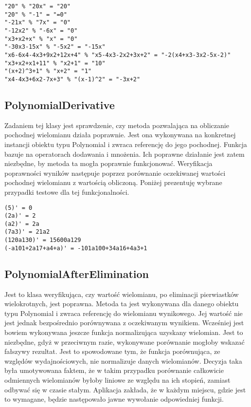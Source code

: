 \documentclass[twoside,a4paper]{book}
\begin{document}
\begin{lstlisting}
"20" % "20x" = "20"
"20" % "-1" = "=0"
"-21x" % "7x" = "0"
"-12x2" % "-6x" = "0"
"x3+x2+x" % "x" = "0"
"-30x3-15x" % "-5x2" = "-15x"
"x6-6x4-4x3+9x2+12x+4" % "x5-4x3-2x2+3x+2" = "-2(x4+x3-3x2-5x-2)"
"x3+x2+x1+11" % "x2+1" = "10"
"(x+2)^3+1" % "x+2" = "1"
"x4-4x3+6x2-7x+3" % "(x-1)^2" = "-3x+2"
\end{lstlisting}

\subsection{PolynomialDerivative}

Zadaniem tej klasy jest sprawdzenie, czy metoda pozwalająca na obliczanie pochodnej wielomianu działa poprawnie. Jest ona wykonywana na konkretnej instancji obiektu typu Polynomial i zwraca referencję do jego pochodnej. Funkcja bazuje na operatorach dodawania i mnożenia. Ich poprawne działanie jest zatem niezbędne, by metoda ta mogła poprawnie funkcjonować.
Weryfikacja poprawności wyników następuje poprzez porównanie oczekiwanej wartości pochodnej wielomianu z wartością obliczoną. Poniżej prezentuję wybrane przypadki testowe dla tej funkcjonalności.

\begin{lstlisting}
(5)' = 0
(2a)' = 2
(a2)' = 2a
(7a3)' = 21a2
(120a130)' = 15600a129
(-a101+2a17+a4+a)' = -101a100+34a16+4a3+1
\end{lstlisting}

\subsection{PolynomialAfterElimination}

Jest to klasa weryfikująca, czy wartość wielomianu, po eliminacji pierwiastków wielokrotnych, jest poprawna. Metoda ta jest wykonywana dla danego obiektu typu Polynomial i zwraca referencję do wielomianu wynikowego. Jej wartość nie jest jednak bezpośrednio porównywana z oczekiwanym wynikiem. Wcześniej jest bowiem wykonywana jeszcze funkcja normalizująca uzyskany wielomian. Jest to niezbędne, gdyż w przeciwnym razie, wykonywane porównanie mogłoby wskazać fałszywy rezultat. Jest to spowodowane tym, że funkcja porównująca, ze względów wydajnościowych, nie normalizuje danych wielomianów. Decyzja taka była umotywowana faktem, że w takim przypadku porównanie całkowicie odmiennych wielomianów byłoby liniowe ze względu na ich stopień, zamiast odbywać się w czasie stałym. Aplikacja zakłada, że w każdym miejscu, gdzie jest to wymagane, będzie następowało jawne wywołanie odpowiedniej funkcji.
\end{document}
